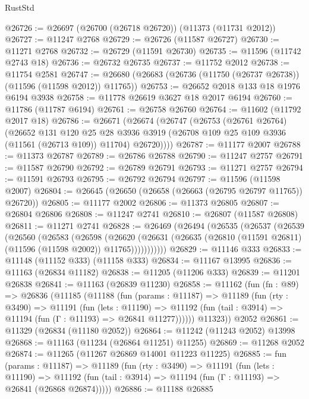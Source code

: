 \begin{lexlean}{RustStd}
\begin{coremodule}
@26726 := @26697 (@26700 (@26718 @26720)) (@11373 (@11731 @2012))
@26727 := @11247 @2768
@26729 := @26726 (@11587 @26727)
@26730 := @11271 @2768
@26732 := @26729 (@11591 @26730)
@26735 := @11596 (@11742 @2743 @18)
@26736 := @26732 @26735
@26737 := @11752 @2012
@26738 := @11754 @2581
@26747 := @26680 (@26683 (@26736 (@11750 (@26737 @26738)) (@11596 (@11598 @2012)) @11765))
@26753 := @26652 @2018 @133 @18 @1976 @6194 @3938
@26758 := @11778 @26619 @3627 @18 @2017 @6194
@26760 := @11786 (@11787 @6194)
@26761 := @26758 @26760
@26764 := @11602 (@11792 @2017 @18)
@26786 := @26671
    (@26674
      (@26747
        (@26753
          (@26761 @26764)
          (@26652
            @131
            @120
            @25
            @28
            @3936
            @3919
            (@26708 @109 @25 @109 @3936 (@11561 (@26713 @109)) @11704)
            @26720))))
@26787 := @11177 @2007
@26788 := @11373 @26787
@26789 := @26786 @26788
@26790 := @11247 @2757
@26791 := @11587 @26790
@26792 := @26789 @26791
@26793 := @11271 @2757
@26794 := @11591 @26793
@26795 := @26792 @26794
@26797 := @11596 (@11598 @2007)
@26804 := @26645 (@26650 (@26658 (@26663 (@26795 @26797 @11765)) @26720))
@26805 := @11177 @2002
@26806 := @11373 @26805
@26807 := @26804 @26806
@26808 := @11247 @2741
@26810 := @26807 (@11587 @26808)
@26811 := @11271 @2741
@26828 := @26469
    (@26494
      (@26535
        (@26537
          (@26539
            (@26560
              (@26583
                (@26598
                  (@26620
                    (@26631
                      (@26635 (@26810 (@11591 @26811) (@11596 (@11598 @2002)) @11765)))))))))))
@26829 := @11146 @333
@26833 := @11148 (@11152 @333) (@11158 @333)
@26834 := @11167 @13995
@26836 := @11163 (@26834 @11182)
@26838 := @11205 (@11206 @333)
@26839 := @11201 @26838
@26841 := @11163 (@26839 @11230)
@26858 := @11162
    (fun (fn : @89) =>
    @26836
      (@11185
        (@11188
          (fun (params : @11187) =>
          @11189
            (fun (rty : @3490) =>
            @11191
              (fun (lets : @11190) =>
              @11192 (fun (tail : @3914) => @11194 (fun (Γ : @11193) => @26841 @11277))))))
        @11323))
    @2052
@26861 := @11329 (@26834 (@11180 @2052))
@26864 := @11242 (@11243 @2052) @13998
@26868 := @11163 (@11234 (@26864 @11251) @11255)
@26869 := @11268 @2052
@26874 := @11265 (@11267 @26869 @14001 @11223 @11225)
@26885 := fun (params : @11187) =>
  @11189
    (fun (rty : @3490) =>
    @11191
      (fun (lets : @11190) =>
      @11192 (fun (tail : @3914) => @11194 (fun (Γ : @11193) => @26841 (@26868 @26874)))))
@26886 := @11188 @26885

\end{coremodule}
\end{lexlean}
